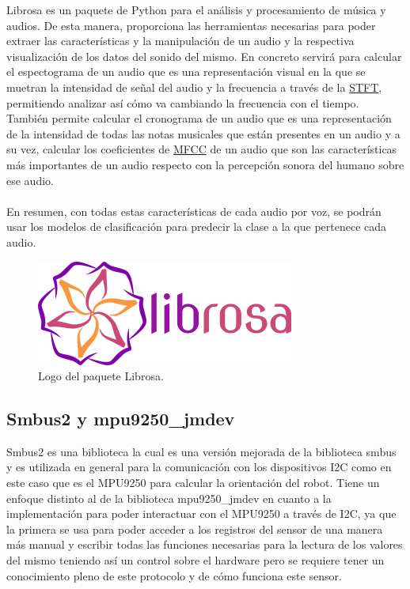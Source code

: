 Librosa es un paquete de Python para el análisis y procesamiento de música y audios. De esta manera, proporciona las herramientas necesarias para poder extraer las características y la manipulación de un audio y la respectiva visualización de los datos del sonido del mismo. En concreto servirá para calcular el espectograma de un audio que es una representación visual en la que se muetran la intensidad de señal del audio y la frecuencia a través de la \hyperlink{STFT}{STFT}, permitiendo analizar así cómo va cambiando la frecuencia con el tiempo.\\

También permite calcular el cronograma de un audio que es una representación de la intensidad de todas las notas musicales que están presentes en un audio y a su vez, calcular los coeficientes de \hyperlink{MFCC}{MFCC} de un audio que son las características más importantes de un audio respecto con la percepción sonora del humano sobre ese audio.\\ \\

En resumen, con todas estas características de cada audio por voz, se podrán usar los modelos de clasificación para predecir la clase a la que pertenece cada audio. 

\begin{figure}[H]
  \centering
  \includegraphics[scale=0.4]{figs/librosa} %
  \caption{Logo del paquete Librosa.}
  \label{fig:librosa}
\end{figure}


\subsection{Smbus2 y mpu9250\_jmdev}
\label{subsec:smbus2mpu9250jmdev}


Smbus2 es una biblioteca la cual es una versión mejorada de la biblioteca smbus y es utilizada en general para la comunicación con los dispositivos I2C como en este caso que es el MPU9250 para calcular la orientación del robot. Tiene un enfoque distinto al de la biblioteca mpu9250\_jmdev en cuanto a la implementación para poder interactuar con el MPU9250 a través de I2C, ya que la primera se usa para poder acceder a los registros del sensor de una manera más manual y escribir todas las funciones necesarias para la lectura de los valores del mismo teniendo así un control sobre el hardware pero se requiere tener un conocimiento pleno de este protocolo y de cómo funciona este sensor.\\

